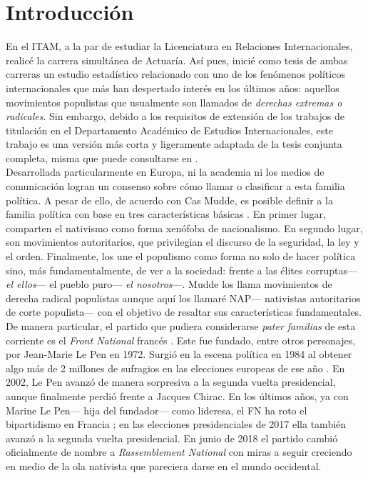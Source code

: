 \chapter*{Introducción}

En el ITAM, a la par de estudiar la Licenciatura en Relaciones Internacionales, realicé la carrera simultánea de Actuaría. Así pues, inicié como tesis de ambas carreras un estudio estadístico relacionado con uno de los fenómenos políticos internacionales que más han despertado interés en los últimos años: aquellos movimientos populistas que usualmente son llamados de \textit{derechas extremas o radicales}. Sin embargo, debido a los requisitos de extensión de los trabajos de titulación en el Departamento Académico de Estudios Internacionales, este trabajo es una versión más corta y ligeramente adaptada de la tesis conjunta completa, misma que puede consultarse en \textcite{TesisAct}.\\  

Desarrollada particularmente en Europa, ni la academia ni los medios de comunicación logran un consenso sobre cómo llamar o clasificar a esta familia política. A pesar de ello, de acuerdo con Cas Mudde, es posible definir a la familia política con base en tres características básicas \parencites{Mudde07a}{Beauchamp16a}. En primer lugar, comparten el nativismo como forma xenófoba de nacionalismo. En segundo lugar, son movimientos autoritarios, que privilegian el discurso de la seguridad, la ley y el orden. Finalmente, los une el populismo como forma no solo de hacer política sino, más fundamentalmente, de ver a la sociedad: frente a las élites corruptas--- \textit{el ellos}--- el pueblo puro--- \textit{el nosotros}---. Mudde los llama movimientos de derecha radical populistas aunque aquí los llamaré NAP--- nativistas autoritarios de corte populista--- con el objetivo de resaltar sus características fundamentales.\\

De manera particular, el partido que pudiera considerarse \textit{pater familias} de esta corriente es el \textit{Front National} francés \parencite{Mudde07a}. Este fue fundado, entre otros personajes, por Jean-Marie Le Pen en 1972. Surgió en la escena política en 1984 al obtener algo más de 2 millones de sufragios en las elecciones europeas de ese año \parencite{LeBras15}. En 2002, Le Pen avanzó de manera sorpresiva a la segunda vuelta presidencial, aunque finalmente perdió frente a Jacques Chirac. En los últimos años, ya con Marine Le Pen--- hija del fundador--- como lideresa, el FN ha roto el bipartidismo en Francia \parencite{LeBras16};  en las elecciones presidenciales de 2017 ella también avanzó a la segunda vuelta presidencial. En junio de 2018 el partido cambió oficialmente de nombre a \textit{Rassemblement National} con miras a seguir creciendo en medio de la ola nativista que pareciera darse en el mundo occidental.\\

